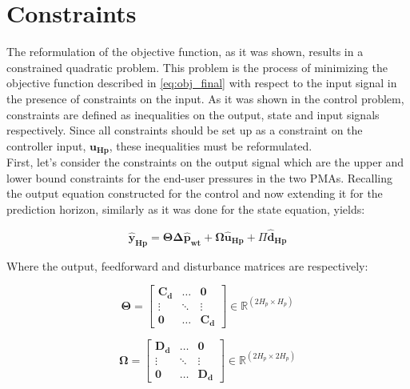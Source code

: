 
\section{Constraints}
\label{constraints_reformulation}

The reformulation of the objective function, as it was shown, results in a constrained quadratic problem. This problem is the process of minimizing the objective function described in \eqref{eq:obj_final} with respect to the input signal in the presence of constraints on the input. As it was shown in the control problem, constraints are defined as inequalities on the output, state and input signals respectively. Since all constraints should be set up as a constraint on the controller input, $\bm{u_{Hp}}$, these inequalities must be reformulated. 
\\
\newline
First, let's consider the constraints on the output signal which are the upper and lower bound constraints for the end-user pressures in the two PMAs. Recalling the output equation constructed for the control and now extending it for the prediction horizon, similarly as it was done for the state equation, yields: 

\begin{equation}
	\bm{\hat{y}_{Hp}} = \bm{\Theta} \bm{\Delta \hat{p}_{wt}} + \bm{\Omega} \bm{\hat{u}_{Hp}} + \Pi \bm{\hat{d}_{Hp}}
\end{equation}

Where the output, feedforward and disturbance matrices are respectively: 

\begin{equation}
  \bm{\Theta} =
 \begin{bmatrix}
 \bm{C_d} & \hdots & \bm{0} \\
 \vdots & \ddots & \vdots\\
 \bm{0} & \hdots & \bm{C_d} 
 \end{bmatrix}
 \in \pmb{\mathbb{R}}^{(2 H_p \times H_p)}
\end{equation}

\begin{equation}
   \bm{\Omega}  =
 \begin{bmatrix}
 \bm{D_d} & \hdots & \bm{0} \\
 \vdots & \ddots & \vdots\\
 \bm{0} & \hdots & \bm{D_d} 
 \end{bmatrix}
 \in \pmb{\mathbb{R}}^{(2 H_p \times 2 H_p)}
 \end{equation}
  
